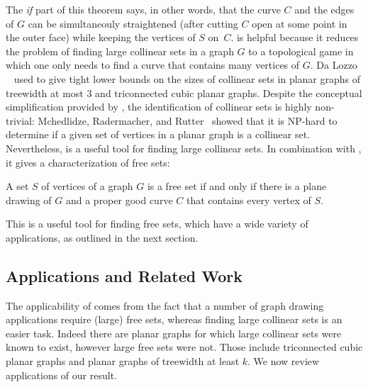 The \emph{if} part of this theorem says, in other words, that the
curve $C$ and the edges of $G$ can be simultaneouly straightened
 (after cutting $C$ open at
some point in the outer face)
while keeping the vertices of $S$ on~$C$.
%
  is helpful because it reduces the problem of
finding large collinear sets in a graph $G$ to a topological game in
which one only needs to find a curve that contains many vertices
of $G$.  Da Lozzo \etal~\cite{dalozzo.dujmovic.ea:drawing}
 used  to give
tight lower bounds on the sizes of collinear sets in planar graphs
of treewidth at most 3 and triconnected cubic planar graphs. Despite the conceptual simplification provided by ,
the identification of collinear sets is highly non-trivial:
Mchedlidze, Radermacher, and Rutter~%
\cite{mchedlidze.radermacher.ea:aligned} showed that it is NP-hard to
determine if a given set of vertices in a planar graph is a collinear
set.
%
Nevertheless,  is a useful tool for finding large 
collinear sets. In combination with , it gives a
characterization of free sets:
\begin{cor}
	A set $S$ of vertices of a graph $G$ is a free set if and
	only if there is a plane drawing of $G$ and a proper good curve $C$
	that contains every vertex of $S$.
      \end{cor}
This is a useful
tool for finding free sets, which have a wide variety of applications,
as outlined in the next section.


\subsection{Applications and Related Work}

The applicability of  comes from the fact that a number of graph drawing applications require (large) free sets, whereas finding large collinear sets
is an easier task. Indeed there are planar graphs for which large collinear sets were known to exist, however large free sets were not. Those include triconnected cubic planar graphs
and planar graphs of treewidth at least $k$.
%
We now review applications of our result. 


